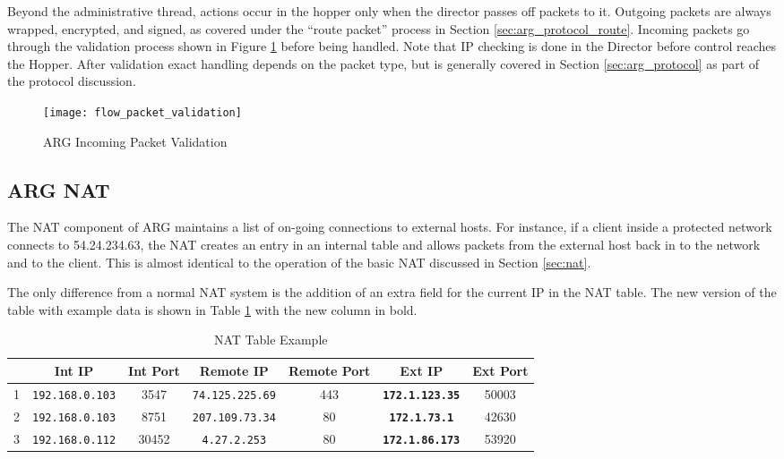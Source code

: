 \par Beyond the administrative thread, actions occur in the hopper only when the director passes off packets to it. Outgoing packets are always wrapped, encrypted, and signed, as covered under the ``route packet'' process in Section \ref{sec:arg_protocol_route}. Incoming packets go through the validation process shown in Figure \ref{fig:arg_hopper_in_validation} before being handled. Note that \ac{IP} checking is done in the Director before control reaches the Hopper. After validation exact handling depends on the packet type, but is generally covered in Section \ref{sec:arg_protocol} as part of the protocol discussion.

\begin{figure}
\caption{\ac{ARG} Incoming Packet Validation}
\label{fig:arg_hopper_in_validation}
\centering
\texttt{[image: flow\_packet\_validation]}
\end{figure}

\subsection{\ac{ARG} \ac{NAT}}
\label{sec:arg_nat}
\par The \ac{NAT} component of \ac{ARG} maintains a list of on-going connections to external hosts. For instance, if a client inside a protected network connects to 54.24.234.63, the \ac{NAT} creates an entry in an internal table and allows packets from the external host back in to the network and to the client. This is almost identical to the operation of the basic \ac{NAT} discussed in Section \ref{sec:nat}.

\par The only difference from a normal \ac{NAT} system is the addition of an extra field for the current \ac{IP} in the \ac{NAT} table. The new version of the table with example data is shown in Table \ref{tab:arg_nat_example} with the new column in bold.

\begin{table}
\caption{NAT Table Example}
\label{tab:arg_nat_example}
\centering
\begin{tabular}{r|cccccc}
  & Int IP & Int Port & Remote IP & Remote Port & \textbf{Ext IP} & Ext Port\\
\hline
1 & \texttt{192.168.0.103} & 3547 & \texttt{74.125.225.69} & 443 & \textbf{\texttt{172.1.123.35}} & 50003\\
2 & \texttt{192.168.0.103} & 8751 & \texttt{207.109.73.34} & 80 & \textbf{\texttt{172.1.73.1}} & 42630\\
3 & \texttt{192.168.0.112} & 30452 & \texttt{4.27.2.253} & 80 & \textbf{\texttt{172.1.86.173}} & 53920
\end{tabular}
\end{table}

